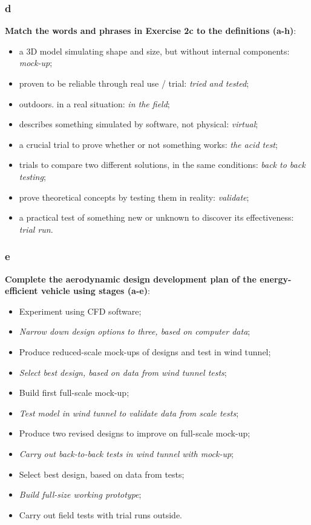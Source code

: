 \subsubsection{d}

\textbf{Match the words and phrases in Exercise 2c to the definitions (a-h)}:

\begin{itemize}

\item a 3D model simulating shape and size, but without internal components: \textit{mock-up};
\item proven to be reliable through real use / trial: \textit{tried and tested};
\item outdoors. in a real situation: \textit{in the field};
\item describes something simulated by software, not physical: \textit{virtual};
\item a crucial trial to prove whether or not something works: \textit{the acid test};
\item trials to compare two different solutions, in the same conditions: \textit{back to back testing};
\item prove theoretical concepts by testing them in reality: \textit{validate};
\item a practical test of something new or unknown to discover its effectiveness: \textit{trial run}.

\end{itemize}

\subsubsection{e}

\textbf{Complete the aerodynamic design development plan of the energy-efficient vehicle using stages (a-e)}:

\begin{itemize}

\item Experiment using CFD software;
\item \textit{Narrow down design options to three, based on computer data};
\item Produce reduced-scale mock-ups of designs and test in wind tunnel;
\item \textit{Select best design, based on data from wind tunnel tests};
\item Build first full-scale mock-up;
\item \textit{Test model in wind tunnel to validate data from scale tests};
\item Produce two revised designs to improve on full-scale mock-up;
\item \textit{Carry out back-to-back tests in wind tunnel with mock-up};
\item Select best design, based on data from tests;
\item \textit{Build full-size working prototype};
\item Carry out field tests with trial runs outside.

\end{itemize}


